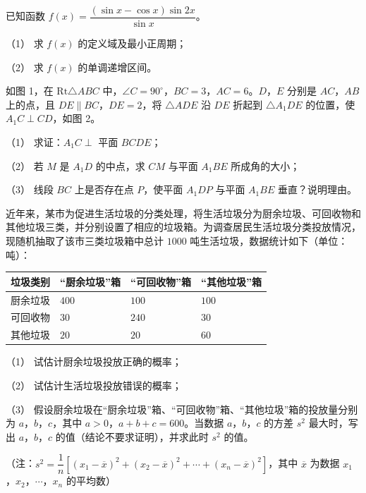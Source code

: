 \begin{question}
已知函数 $f(x)=\dfrac{(\sin x-\cos x)\sin2x}{\sin x}$。

（1） 求 $f(x)$ 的定义域及最小正周期；

（2） 求 $f(x)$ 的单调递增区间。

\Needspace{0.4\textheight}
\end{question}
\begin{question}
如图 1，在 $\mathrm{Rt}\triangle ABC$ 中，$\angle C=90^\circ$，$BC=3$，$AC=6$。$D$，$E$ 分别是 $AC$，$AB$ 上的点，且 $DE\parallel BC$，$DE=2$，将 $\triangle ADE$ 沿 $DE$ 折起到 $\triangle A_1DE$ 的位置，使 $A_1C\perp CD$，如图 2。

（1） 求证：$A_1C\perp$ 平面 $BCDE$；

（2） 若 $M$ 是 $A_1D$ 的中点，求 $CM$ 与平面 $A_1BE$ 所成角的大小；

（3） 线段 $BC$ 上是否存在点 $P$，使平面 $A_1DP$ 与平面 $A_1BE$ 垂直？说明理由。
\nopagebreak[4]
\begin{center}\end{center}
\nopagebreak[4]
\end{question}
\begin{question}
近年来，某市为促进生活垃圾的分类处理，将生活垃圾分为厨余垃圾、可回收物和其他垃圾三类，并分别设置了相应的垃圾箱。为调查居民生活垃圾分类投放情况，现随机抽取了该市三类垃圾箱中总计 $1000$ 吨生活垃圾，数据统计如下（单位：吨）：

\begin{center}
\begin{tabular}{llll}
\toprule
垃圾类别 & “厨余垃圾”箱 & “可回收物”箱 & “其他垃圾”箱 \\
\midrule
厨余垃圾 & $400$ & $100$ & $100$ \\
可回收物 & $30$ & $240$ & $30$ \\
其他垃圾 & $20$ & $20$ & $60$ \\
\bottomrule
\end{tabular}
\end{center}

（1） 试估计厨余垃圾投放正确的概率；

（2） 试估计生活垃圾投放错误的概率；

（3） 假设厨余垃圾在“厨余垃圾”箱、“可回收物”箱、“其他垃圾”箱的投放量分别为 $a$，$b$，$c$，其中 $a>0$，$a+b+c=600$。当数据 $a$，$b$，$c$ 的方差 $s^2$ 最大时，写出 $a$，$b$，$c$ 的值（结论不要求证明），并求此时 $s^2$ 的值。

（注：$s^2=\dfrac1n\left[(x_1-\overline x)^2+(x_2-\overline x)^2+\cdots+(x_n-\overline x)^2\right]$，其中 $\overline x$ 为数据 $x_1$，$x_2$，$\cdots$，$x_n$ 的平均数）

\end{question}
